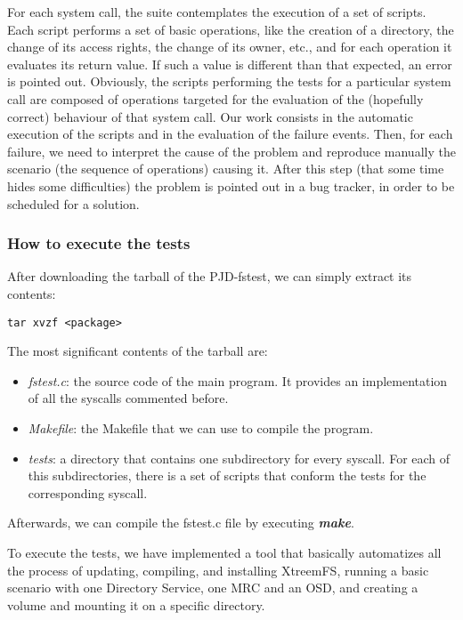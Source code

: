 For each system call, the suite contemplates the execution of a set
of scripts. Each script performs a set of basic operations, like the
creation of a directory, the change of its access rights, the change
of its owner, etc., and for each operation it evaluates its return
value. If such a value is different than that expected, an error is
pointed out. Obviously, the scripts performing the tests for a
particular system call are composed of operations targeted for the
evaluation of the (hopefully correct) behaviour of that system call.
Our work consists in the automatic execution of the scripts and in
the evaluation of the failure events. Then, for each failure, we
need to interpret the cause of the problem and reproduce manually
the scenario (the sequence of operations) causing it. After this
step (that some time hides some difficulties) the problem is pointed
out in a bug tracker, in order to be scheduled for a solution.

\subsubsection{How to execute the tests}

After downloading the tarball of the PJD-fstest, we can simply extract its contents:

\verb"tar xvzf <package>"

The most significant contents of the tarball are:

\begin{itemize}
\item \textit{fstest.c}: the source code
of the main program. It provides an implementation of all the syscalls commented before.
\item \textit{Makefile}: the Makefile that we can use to compile the program.
\item \textit{tests}: a directory that contains one subdirectory for every syscall.
For each of this subdirectories, there is a set of scripts that conform the tests for the corresponding syscall.
\end{itemize}

Afterwards, we can compile the fstest.c file by executing \textbf{\textit{make}}.

To execute the tests, we have implemented a tool that basically
automatizes all  the process of updating, compiling, and installing
XtreemFS, running a basic scenario with one Directory Service, one
MRC and an OSD, and creating a volume and mounting it on a specific
directory.

